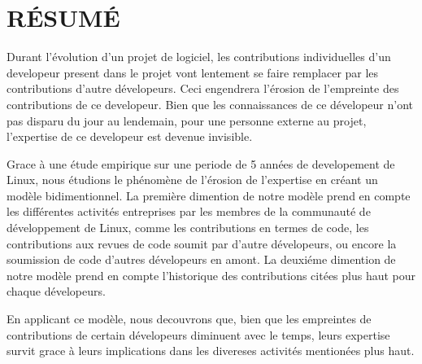 %
%

\chapter*{RÉSUMÉ}\thispagestyle{headings}

Durant l'évolution d'un projet de logiciel, les contributions individuelles d'un developeur present dans le projet vont lentement se faire remplacer par les contributions d'autre dévelopeurs. Ceci engendrera l'érosion de l'empreinte des contributions de ce developeur. Bien que les connaissances de ce dévelopeur n'ont pas disparu du jour au lendemain, pour une personne externe au projet, l'expertise de ce developeur est devenue invisible. 

Grace à une étude empirique sur une periode de 5 années de developement de Linux, nous étudions le phénomène de l'érosion de l'expertise en créant un modèle bidimentionnel. La première dimention de notre modèle prend en compte les différentes activités entreprises par les membres de la communauté de développement de Linux, comme les contributions en termes de code, les contributions aux revues de code soumit par d'autre dévelopeurs, ou encore la soumission de code d'autres dévelopeurs en amont. La deuxiéme dimention de notre modèle prend en compte l'historique des contributions citées plus haut pour chaque dévelopeurs. 

En applicant ce modèle, nous decouvrons que, bien que les empreintes de contributions de certain dévelopeurs diminuent avec le temps, leurs expertise survit grace à leurs implications dans les divereses activités mentionées plus haut. 


